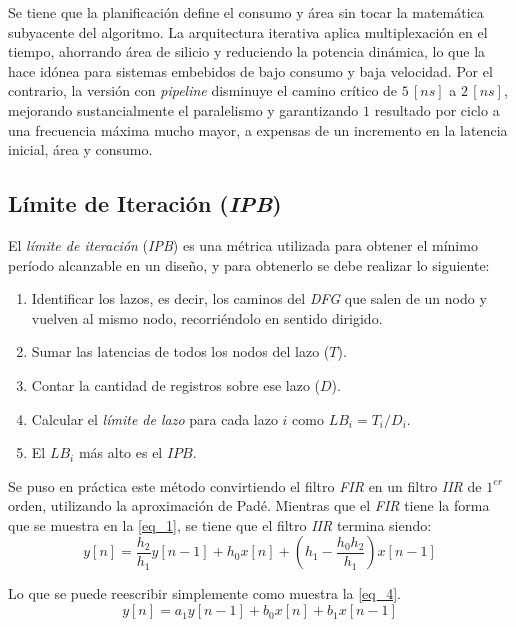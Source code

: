 \documentclass[12pt,a4paper]{article}
\begin{document}
Se tiene que la planificación define el consumo y área sin tocar la matemática subyacente del algoritmo. La arquitectura iterativa aplica multiplexación en el tiempo, ahorrando área de silicio y reduciendo la potencia dinámica, lo que la hace idónea para sistemas embebidos de bajo consumo y baja velocidad. Por el contrario, la versión con \textit{pipeline} disminuye el camino crítico de $5 \, [ns]$ a $2 \, [ns]$, mejorando sustancialmente el paralelismo y garantizando $1$ resultado por ciclo a una frecuencia máxima mucho mayor, a expensas de un incremento en la latencia inicial, área y consumo.




\subsection{Límite de Iteración (\emph{IPB})}                       \label{sec_2.6}
El \emph{límite de iteración} (\emph{IPB}) es una métrica utilizada para obtener el mínimo período alcanzable en un diseño, y para obtenerlo se debe realizar lo siguiente:
\begin{enumerate}
    \item Identificar los lazos, es decir, los caminos del \textit{DFG} que salen de un nodo y vuelven al mismo nodo, recorriéndolo en sentido dirigido.
    \item Sumar las latencias de todos los nodos del lazo ($T$).
    \item Contar la cantidad de registros sobre ese lazo ($D$).
    \item Calcular el \emph{límite de lazo} para cada lazo $i$ como $LB_{i} = T_{i} / D_{i}$.
    \item El $LB_{i}$ más alto es el $IPB$.
\end{enumerate}

Se puso en práctica este método convirtiendo el filtro \textit{FIR} en un filtro \textit{IIR} de $1^{er}$ orden, utilizando la aproximación de Padé. Mientras que el \textit{FIR} tiene la forma que se muestra en la \autoref{eq_1}, se tiene que el filtro \textit{IIR} termina siendo:
\begin{equation}
    y[n] = \frac{h_{2}}{h_{1}} y[n-1] + h_{0} x[n] + \left(h_{1} - \frac{h_{0} h_{2}}{h_{1}}\right) x[n-1]
    \label{eq_3}
\end{equation}

Lo que se puede reescribir simplemente como muestra la \autoref{eq_4}.
\begin{equation}
    y[n] = a_{1} y[n-1] + b_{0} x[n] + b_{1} x[n-1]
    \label{eq_4}
\end{equation}
\end{document}
